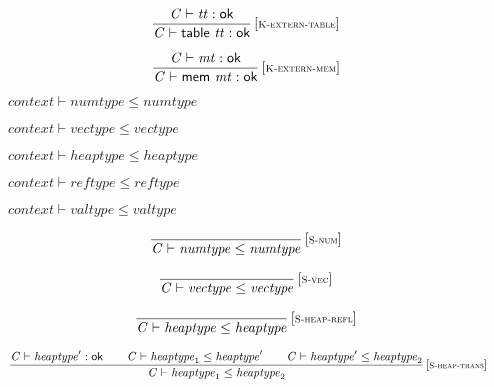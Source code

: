 $$
\begin{array}{@{}c@{}}\displaystyle
\frac{
{\mathit{C}} \vdash {\mathit{tt}} : \mathsf{ok}
}{
{\mathit{C}} \vdash \mathsf{table}~{\mathit{tt}} : \mathsf{ok}
} \, {[\textsc{\scriptsize K{-}extern{-}table}]}
\qquad
\end{array}
$$

$$
\begin{array}{@{}c@{}}\displaystyle
\frac{
{\mathit{C}} \vdash {\mathit{mt}} : \mathsf{ok}
}{
{\mathit{C}} \vdash \mathsf{mem}~{\mathit{mt}} : \mathsf{ok}
} \, {[\textsc{\scriptsize K{-}extern{-}mem}]}
\qquad
\end{array}
$$

\vspace{1ex}

\vspace{1ex}

$\boxed{{\mathit{context}} \vdash {\mathit{numtype}} \leq {\mathit{numtype}}}$

$\boxed{{\mathit{context}} \vdash {\mathit{vectype}} \leq {\mathit{vectype}}}$

$\boxed{{\mathit{context}} \vdash {\mathit{heaptype}} \leq {\mathit{heaptype}}}$

$\boxed{{\mathit{context}} \vdash {\mathit{reftype}} \leq {\mathit{reftype}}}$

$\boxed{{\mathit{context}} \vdash {\mathit{valtype}} \leq {\mathit{valtype}}}$

$$
\begin{array}{@{}c@{}}\displaystyle
\frac{
}{
{\mathit{C}} \vdash {\mathit{numtype}} \leq {\mathit{numtype}}
} \, {[\textsc{\scriptsize S{-}num}]}
\qquad
\end{array}
$$

$$
\begin{array}{@{}c@{}}\displaystyle
\frac{
}{
{\mathit{C}} \vdash {\mathit{vectype}} \leq {\mathit{vectype}}
} \, {[\textsc{\scriptsize S{-}vec}]}
\qquad
\end{array}
$$

\vspace{1ex}

$$
\begin{array}{@{}c@{}}\displaystyle
\frac{
}{
{\mathit{C}} \vdash {\mathit{heaptype}} \leq {\mathit{heaptype}}
} \, {[\textsc{\scriptsize S{-}heap{-}refl}]}
\qquad
\end{array}
$$

$$
\begin{array}{@{}c@{}}\displaystyle
\frac{
{\mathit{C}} \vdash {\mathit{heaptype}'} : \mathsf{ok}
 \qquad
{\mathit{C}} \vdash {\mathit{heaptype}}_{{1}} \leq {\mathit{heaptype}'}
 \qquad
{\mathit{C}} \vdash {\mathit{heaptype}'} \leq {\mathit{heaptype}}_{{2}}
}{
{\mathit{C}} \vdash {\mathit{heaptype}}_{{1}} \leq {\mathit{heaptype}}_{{2}}
} \, {[\textsc{\scriptsize S{-}heap{-}trans}]}
\qquad
\end{array}
$$

